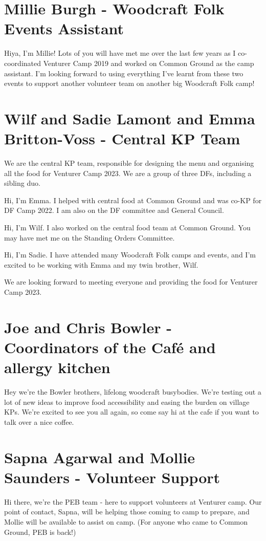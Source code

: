 \documentclass[a4paper, 10pt]{report}
\begin{document}
\section{Millie Burgh - Woodcraft Folk Events Assistant}
Hiya, I'm Millie! Lots of you will have met me over the last few years as I co-coordinated Venturer Camp 2019 and worked on Common Ground as the camp assistant. I'm looking forward to using everything I've learnt from these two events to support another volunteer team on another big Woodcraft Folk camp!
\section{Wilf and Sadie Lamont and Emma Britton-Voss - Central KP Team}
We are the central KP team, responsible for designing the menu and organising all the food for Venturer Camp 2023. We are a group of three DFs, including a sibling duo.

Hi, I'm Emma. I helped with central food at Common Ground and was co-KP for DF Camp 2022. I am also on the DF committee and General Council.

Hi, I'm Wilf. I also worked on the central food team at Common Ground. You may have met me on the Standing Orders Committee.

Hi, I'm Sadie. I have attended many Woodcraft Folk camps and events, and I'm excited to be working with Emma and my twin brother, Wilf.

We are looking forward to meeting everyone and providing the food for Venturer Camp 2023.
\section{Joe and Chris Bowler - Coordinators of the Café and allergy kitchen }
Hey we're the Bowler brothers, lifelong woodcraft busybodies. We're testing out a lot of new ideas to improve food accessibility and easing the burden on village KPs. We're excited to see you all again, so come say hi at the cafe if you want to talk over a nice coffee.
\section{Sapna Agarwal and Mollie Saunders - Volunteer Support}
Hi there, we're the PEB team - here to support volunteers at Venturer camp. Our point of contact, Sapna, will be helping those coming to camp to prepare, and Mollie will be available to assist on camp. (For anyone who came to Common Ground, PEB is back!)
\end{document}
